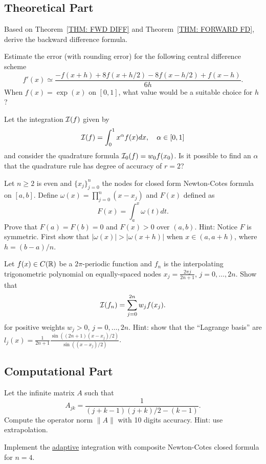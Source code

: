 \subsection{Theoretical Part}
\begin{problem}
    Based on Theorem~\ref{THM: FWD DIFF} and Theorem~\ref{THM: FORWARD FD}, derive the backward difference formula.
\end{problem}
\begin{problem}
    Estimate the error (with rounding error) for the following central difference scheme
    $$f'(x)\simeq \frac{-f(x + h) + 8f(x + h/2) - 8 f(x - h/2) + f(x - h)}{6h}.$$
    When $f(x)=\exp(x)$ on $[0, 1]$, what value would be a suitable choice for $h$?
\end{problem}
\begin{problem}
    Let the integration $\mathcal I(f)$ given by
    $$\mathcal I(f) = \int_0^1 x^{\alpha} f(x) dx,\quad \alpha\in [0, 1]$$
    and consider the quadrature formula $\mathcal I_0(f) = w_0 f(x_0)$. Is it possible to find an $\alpha$ that the quadrature rule has degree of accuracy of $r= 2$?
\end{problem}
\begin{problem}
    Let $n\ge 2$ is even and $\{ x_j\}_{j=0}^n$ the nodes for closed form Newton-Cotes formula on $[a, b]$. Define $\omega(x)=\prod_{j=0}^n (x - x_j)$ and $F(x)$ defined as 
    $$F(x) = \int_a^x \omega(t)dt.$$
    Prove that $F(a) = F(b) = 0$ and $F(x) > 0$ over $(a ,b)$. 
    Hint: Notice $F$ is symmetric. First show that $|\omega(x)| > |\omega(x + h)|$ when $x\in (a, a + h)$, where $h = (b-a)/n$.
\end{problem}
\begin{problem}
    Let $f(x)\in C(\mathbb R)$ be a $2\pi$-periodic function and $f_n$ is the interpolating trigonometric polynomial on equally-spaced nodes $x_j = \frac{2\pi j}{2n+1}$, $j=0,\dots, 2n$. Show that 
    \begin{equation}
       \mathcal I(f_n) = \sum_{j=0}^{2n} w_j f(x_j).
    \end{equation}
    for positive weights $w_j > 0$, $j = 0,\dots, 2n$.
    Hint: show that the ``Lagrange basis'' are $l_j(x) =\frac{1}{2n+1} \frac{\sin((2n+1)(x- x_j)/2)}{\sin((x-x_j)/2)}$.
\end{problem}

 
\subsection{Computational Part}
\begin{problem}
    Let the infinite matrix $A$ such that $$A_{jk} = \frac{1}{(j+k-1)(j+k)/2 - (k-1)}.$$
    Compute the operator norm $\|A\|$ with 10 digits accuracy. Hint: use extrapolation.
\end{problem}
\begin{problem}
    Implement the \underline{adaptive} integration with  composite Newton-Cotes closed formula for $n = 4$. 
\end{problem}


